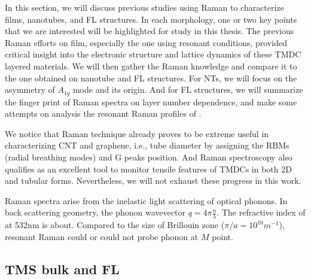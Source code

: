 In this section, we will discuss previous studies using Raman to characterize  films, nanotubes, and FL structures. In each morphology, one or two key points that we are interested will be highlighted for study in this thesis. The previous Raman efforts on  film, especially the one using resonant conditions, provided critical insight into the electronic structure and lattice dynamics of these TMDC layered materials. We will then gather the Raman knowledge and compare it to the one obtained on nanotube and FL structures. For  NTs, we will focus on the asymmetry of $A_{1g}$ mode and its origin. And for  FL structures, we will summarize the finger print of Raman spectra on layer number dependence, and make some attempts on analysis the resonant Raman profiles of .

We notice that Raman technique already proves to be extreme useful in characterizing CNT and graphene, i.e., tube diameter by assigning the RBMs (radial breathing modes) and G peaks position.\cite{Bonaccorso2013} And Raman spectroscopy also qualifies as an excellent tool to monitor tensile features of TMDCs in both 2D and tubular forms.\cite{Tang2013} Nevertheless, we will not exhaust these progress in this work.

Raman spectra arise from the inelastic light scattering of optical phonons. In back scattering geometry, the phonon wavevector
$q = 4\pi\frac{n}{\lambda}$. The refractive index of  at 532nm is about. Compared to the size of Brillouin zone ($\pi/a = 10^{10}m^{-1}$), resonant Raman could or could not probe phonon at $M$ point.


\subsection{TMS bulk and FL}

